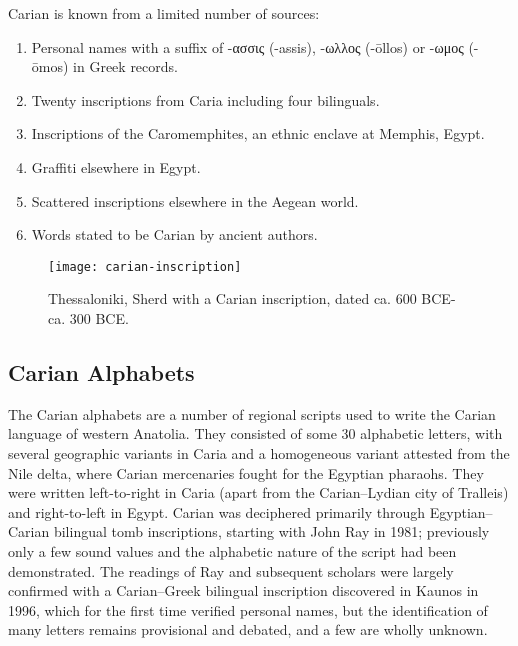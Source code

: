 Carian is known from a limited number of sources:

\begin{enumerate}
\item Personal names with a suffix of -ασσις (-assis), -ωλλος (-ōllos) or -ωμος (-ōmos) in Greek records.
\item Twenty inscriptions from Caria including four bilinguals.
\item Inscriptions of the Caromemphites, an ethnic enclave at Memphis, Egypt.
\item Graffiti elsewhere in Egypt.
\item Scattered inscriptions elsewhere in the Aegean world.
\item Words stated to be Carian by ancient authors.
\end{enumerate}


\begin{figure}[htbp]
\centering
\texttt{[image: carian-inscription]}
\caption[Thessaloniki, Sherd with a Carian inscription]{Thessaloniki, Sherd with a Carian inscription, dated ca. 600 BCE-ca. 300 BCE.} 

\end{figure}


\subsection{Carian Alphabets} 



The Carian alphabets are a number of regional scripts used to write the Carian language of western Anatolia. They consisted of some 30 alphabetic letters, with several geographic variants in Caria and a homogeneous variant attested from the Nile delta, where Carian mercenaries fought for the Egyptian pharaohs. They were written left-to-right in Caria (apart from the Carian–Lydian city of Tralleis) and right-to-left in Egypt. Carian was deciphered primarily through Egyptian–Carian bilingual tomb inscriptions, starting with John Ray in 1981; previously only a few sound values and the alphabetic nature of the script had been demonstrated. The readings of Ray and subsequent scholars were largely confirmed with a Carian–Greek bilingual inscription discovered in Kaunos in 1996, which for the first time verified personal names, but the identification of many letters remains provisional and debated, and a few are wholly unknown.

